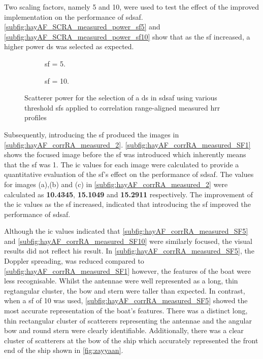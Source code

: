 \documentclass[class=report,11pt,crop=false]{standalone}
\begin{document}
    Two scaling factors, namely 5 and 10, were used to test the effect of the improved implementation on the performance of \gls{sdsaf}. \autoref{subfig:hayAF_SCRA_measured_power_sf5} and \autoref{subfig:hayAF_SCRA_measured_power_sf10} show that as the \gls{sf} increased, a higher power \gls{ds} was selected as expected.
    \begin{figure}[H]
        \centering
        \begin{subfigure}{0.4\linewidth}
            \resizebox{\linewidth}{!}{}
            \caption{\gls{sf} = 5. \label{subfig:hayAF_SCRA_measured_power_sf5}}
        \end{subfigure}
        \hspace{0.5cm}
        \begin{subfigure}{0.4\linewidth}
            \resizebox{\linewidth}{!}{}
            \caption{\gls{sf} = 10. \label{subfig:hayAF_SCRA_measured_power_sf10}}
        \end{subfigure}
        \caption{Scatterer power for the selection of a \gls{ds} in \gls{sdsaf} using various threshold \gls{sf}s applied to correlation range-aligned measured \gls{hrr} profiles} \label{fig:hayAF_SCRA_measured_power_2}
    \end{figure}

    Subsequently, introducing the \gls{sf} produced the images in \autoref{subfig:hayAF_corrRA_measured_2}. \autoref{subfig:hayAF_corrRA_measured_SF1} shows the focused image before the \gls{sf} was introduced which inherently means that the \gls{sf} was 1. The \gls{ic} values for each image were calculated to provide a quantitative evaluation of the \gls{sf}'s effect on the performance of \gls{sdsaf}. The values for images (a),(b) and (c) in \autoref{subfig:hayAF_corrRA_measured_2} were calculated as \textbf{10.4345}, \textbf{15.1049} and \textbf{15.2911} respectively. The improvement of the \gls{ic} values as the \gls{sf} increased, indicated that introducing the \gls{sf} improved the performance of \gls{sdsaf}.
    
    Although the \gls{ic} values indicated that \autoref{subfig:hayAF_corrRA_measured_SF5} and \autoref{subfig:hayAF_corrRA_measured_SF10} were similarly focused, the visual results did not reflect his result. In \autoref{subfig:hayAF_corrRA_measured_SF5}, the Doppler spreading, was reduced compared to \autoref{subfig:hayAF_corrRA_measured_SF1} however, the features of the boat were less recognisable. Whilst the antennae were well represented as a long, thin regtangular cluster, the bow and stern were taller than expected. In contrast, when a \gls{sf} of 10 was used, \autoref{subfig:hayAF_corrRA_measured_SF5} showed the most accurate representation of the boat's features. There was a distinct long, thin rectangular cluster of scatterers representing the antennae and the angular bow and round stern were clearly identifiable. Additionally, there was a clear cluster of scatterers at the bow of the ship which accurately represented the front end of the ship shown in \autoref{fig:zayyaan}.
\end{document}
